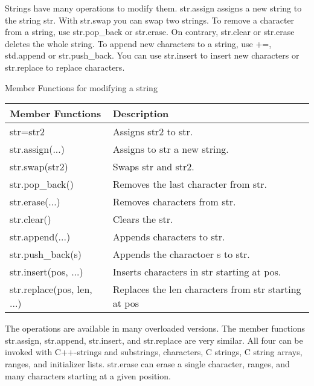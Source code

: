 
Strings have many operations to modify them. str.assign assigns a new string to the string str. With str.swap you can swap two strings. To remove a character from a string, use str.pop\_back or str.erase. On contrary, str.clear or str.erase deletes the whole string. To append new characters to a string, use +=, std.append or str.push\_back. You can use str.insert to insert new characters or str.replace to replace characters.


\begin{center}
Member Functions for modifying a string
\end{center}

\begin{longtable}[c]{|l|l|}
\hline
\textbf{Member Functions}  & \textbf{Description}                                 \\ \hline
\endfirsthead
%
\endhead
%
str=str2                   & Assigns str2 to str.                                 \\ \hline
str.assign(...)            & Assigns to str a new string.                         \\ \hline
str.swap(str2)             & Swaps str and str2.                                  \\ \hline
str.pop\_back()            & Removes the last character from str.                 \\ \hline
str.erase(...)             & Removes characters from str.                         \\ \hline
str.clear()                & Clears the str.                                      \\ \hline
str.append(...)            & Appends characters to str.                           \\ \hline
str.push\_back(s)          & Appends the charactoer s to str.                     \\ \hline
str.insert(pos, ...)       & Inserts characters in str starting at pos.           \\ \hline
str.replace(pos, len, ...) & Replaces the len characters from str starting at pos \\ \hline
\end{longtable}

The operations are available in many overloaded versions. The member functions str.assign, str.append, str.insert, and str.replace are very similar. All four can be invoked with C++-strings and substrings, characters, C strings, C string arrays, ranges, and initializer lists. str.erase can erase a single character, ranges, and many characters starting at a given position.

